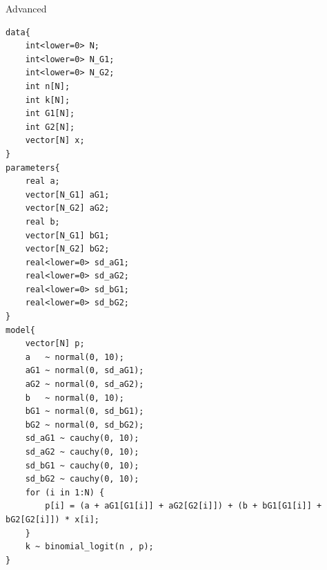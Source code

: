 \documentclass[11pt, oneside, openany]{scrbook}
\begin{document}

Advanced


\begin{verbatim}
data{
    int<lower=0> N;
    int<lower=0> N_G1;
    int<lower=0> N_G2;
    int n[N];
    int k[N];
    int G1[N];
    int G2[N];
    vector[N] x;
}
parameters{
    real a;
    vector[N_G1] aG1;
    vector[N_G2] aG2;
    real b;
    vector[N_G1] bG1;
    vector[N_G2] bG2;
    real<lower=0> sd_aG1;
    real<lower=0> sd_aG2;
    real<lower=0> sd_bG1;
    real<lower=0> sd_bG2;
}
model{
    vector[N] p;
    a   ~ normal(0, 10);
    aG1 ~ normal(0, sd_aG1);
    aG2 ~ normal(0, sd_aG2);
    b   ~ normal(0, 10);
    bG1 ~ normal(0, sd_bG1);
    bG2 ~ normal(0, sd_bG2);
    sd_aG1 ~ cauchy(0, 10);
    sd_aG2 ~ cauchy(0, 10);
    sd_bG1 ~ cauchy(0, 10);
    sd_bG2 ~ cauchy(0, 10);
    for (i in 1:N) {
        p[i] = (a + aG1[G1[i]] + aG2[G2[i]]) + (b + bG1[G1[i]] + bG2[G2[i]]) * x[i];
    }
    k ~ binomial_logit(n , p);
}
\end{verbatim}


\backmatter

\end{document}
